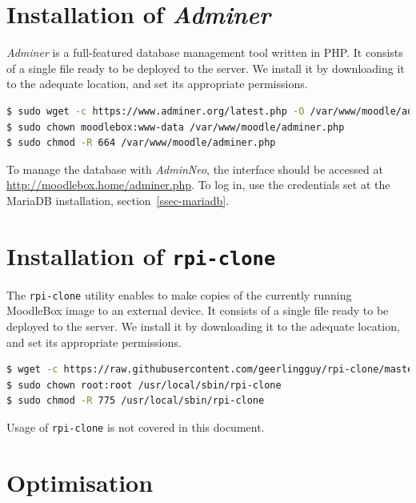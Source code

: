 \documentclass[12pt]{article}
\begin{document}
\section{Installation of \textsl{Adminer}}

\textsl{Adminer} is a full-featured database management tool written in PHP.
It consists of a single file ready to be deployed to the server.
We install it by downloading it to the adequate location, and set its appropriate permissions.
\begin{lstlisting}[language=bash]
$ sudo wget -c https://www.adminer.org/latest.php -O /var/www/moodle/adminer.php
$ sudo chown moodlebox:www-data /var/www/moodle/adminer.php
$ sudo chmod -R 664 /var/www/moodle/adminer.php
\end{lstlisting}

To manage the database with \textsl{AdminNeo}, the interface should be accessed at \url{http://moodlebox.home/adminer.php}.
To log in, use the credentials set at the MariaDB installation, section~\ref{ssec-mariadb}.

\section{Installation of \texttt{rpi-clone}}

The \texttt{rpi-clone} utility enables to make copies of the currently running MoodleBox image to an external device.
It consists of a single file ready to be deployed to the server.
We install it by downloading it to the adequate location, and set its appropriate permissions.
\begin{lstlisting}[language=bash]
$ wget -c https://raw.githubusercontent.com/geerlingguy/rpi-clone/master/rpi-clone -O /usr/local/sbin/rpi-clone
$ sudo chown root:root /usr/local/sbin/rpi-clone
$ sudo chmod -R 775 /usr/local/sbin/rpi-clone
\end{lstlisting}

Usage of \texttt{rpi-clone} is not covered in this document.

\section{Optimisation}\label{sec-optimisation}
\end{document}
